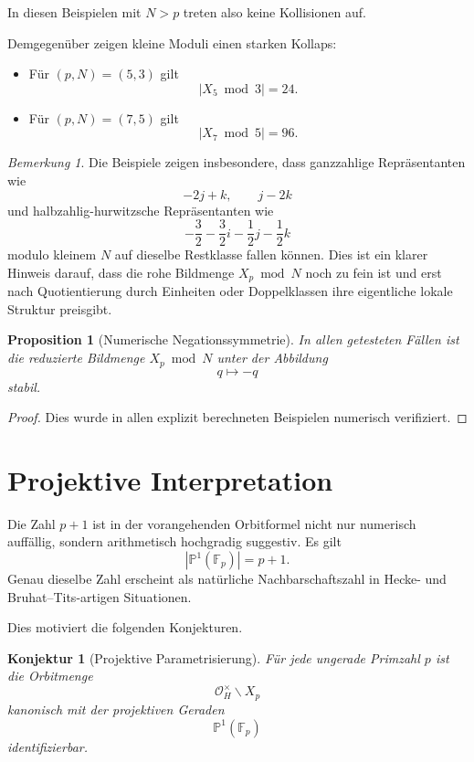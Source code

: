 \documentclass[12pt,a4paper]{article}
\theoremstyle{plain}
\newtheorem{proposition}[satz]{Proposition}
\newtheorem{konjektur}[satz]{Konjektur}
\theoremstyle{definition}
\theoremstyle{remark}
\newtheorem{bemerkung}[satz]{Bemerkung}
\newcommand{\OH}{\mathcal O_H}
\newcommand{\Fp}{\mathbb F_p}
\newcommand{\PP}{\mathbb P}
\begin{document}
	In diesen Beispielen mit \(N>p\) treten also keine Kollisionen auf.
	
	Demgegenüber zeigen kleine Moduli einen starken Kollaps:
	
	\begin{itemize}
		\item Für \((p,N)=(5,3)\) gilt
		\[
		|X_5 \bmod 3|=24.
		\]
		\item Für \((p,N)=(7,5)\) gilt
		\[
		|X_7 \bmod 5|=96.
		\]
	\end{itemize}
	
	\begin{bemerkung}
		Die Beispiele zeigen insbesondere, dass ganzzahlige Repräsentanten wie
		\[
		-2j+k,\qquad j-2k
		\]
		und halbzahlig-hurwitzsche Repräsentanten wie
		\[
		-\frac32-\frac32i-\frac12j-\frac12k
		\]
		modulo kleinem \(N\) auf dieselbe Restklasse fallen können. Dies ist ein klarer Hinweis darauf,
		dass die rohe Bildmenge \(X_p \bmod N\) noch zu fein ist und erst nach Quotientierung durch Einheiten
		oder Doppelklassen ihre eigentliche lokale Struktur preisgibt.
	\end{bemerkung}
	
	\begin{proposition}[Numerische Negationssymmetrie]
		In allen getesteten Fällen ist die reduzierte Bildmenge \(X_p \bmod N\) unter der Abbildung
		\[
		q \longmapsto -q
		\]
		stabil.
	\end{proposition}
	
	\begin{proof}
		Dies wurde in allen explizit berechneten Beispielen numerisch verifiziert.
	\end{proof}
	
	\section{Projektive Interpretation}
	
	Die Zahl \(p+1\) ist in der vorangehenden Orbitformel nicht nur numerisch auffällig, sondern
	arithmetisch hochgradig suggestiv. Es gilt
	\[
	|\PP^1(\Fp)|=p+1.
	\]
	Genau dieselbe Zahl erscheint als natürliche Nachbarschaftszahl in Hecke- und Bruhat--Tits-artigen
	Situationen.
	
	Dies motiviert die folgenden Konjekturen.
	
	\begin{konjektur}[Projektive Parametrisierung]
		Für jede ungerade Primzahl \(p\) ist die Orbitmenge
		\[
		\OH^\times\backslash X_p
		\]
		kanonisch mit der projektiven Geraden
		\[
		\PP^1(\Fp)
		\]
		identifizierbar.
	\end{konjektur}
	
\end{document}

